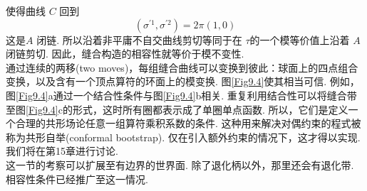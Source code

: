 使得曲线 $C$ 回到
\begin{equation}
	\left(\sigma^{\prime 1}, \sigma^{\prime 2}\right)=2 \pi(1,0)
\end{equation}
这是$A$ 闭链. 所以沿着非平庸不自交曲线剪切等同于在 $\tau $的一个模等价值上沿着 $A$ 闭链剪切. 因此，缝合构造的相容性就等价于模不变性.\\
通过连续的两移(two moves)，每组缝合曲线可以变换到彼此：球面上的四点组合变换，以及含有一个顶点算符的环面上的模变换. 图\ref{Fig9.4}使其相当可信. 例如，图\ref{Fig9.4}a通过一个结合性条件与图\ref{Fig9.4}b相关. 重复利用结合性可以将缝合带至图\ref{Fig9.4}c的形式，这时所有圈都表示成了单圈单点函数. 所以，它们是定义一个合理的共形场论任意一组算符乘积系数的条件. 这种用来解决对偶约束的程式被称为共形自举(conformal bootstrap). 仅在引入额外约束的情况下，这才得以实现. 我们将在第15章进行讨论.\\
这一节的考察可以扩展至有边界的世界面. 除了退化柄以外，那里还会有退化带. 相容性条件已经推广至这一情况.

